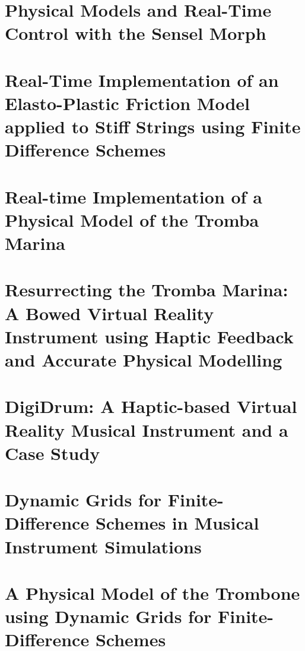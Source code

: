 
\ifpapers
    
\fi

\chapter{Physical Models and Real-Time Control with the Sensel Morph}\label{paper:B}
\ifpapers
    
\fi

\chapter{Real-Time Implementation of an Elasto-Plastic Friction Model applied to Stiff Strings using Finite Difference Schemes}\label{paper:C}
\ifpapers
    
\fi

\chapter{Real-time Implementation of a Physical Model of the Tromba Marina}\label{paper:D}
\ifpapers
    
\fi

\chapter{Resurrecting the Tromba Marina: A Bowed Virtual Reality Instrument using Haptic Feedback and Accurate Physical Modelling}\label{paper:E}
\ifpapers
    
\fi

\chapter{DigiDrum: A Haptic-based Virtual Reality Musical Instrument and a Case Study}\label{paper:F}
\ifpapers
    
\fi

\chapter{Dynamic Grids for Finite-Difference Schemes in Musical Instrument Simulations}\label{paper:G}
\ifpapers
\fi

\chapter{A Physical Model of the Trombone using Dynamic Grids for Finite-Difference Schemes}\label{paper:H}
\ifpapers
\fi